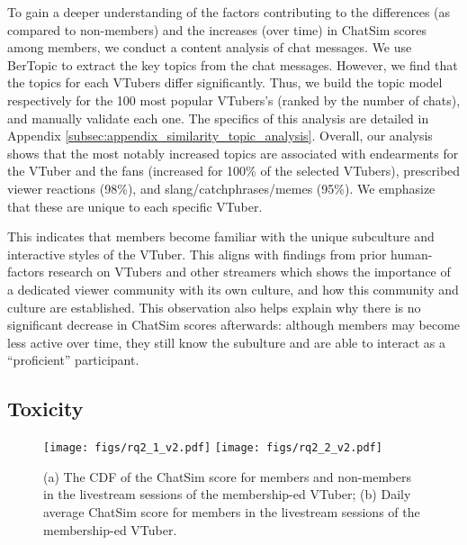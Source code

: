 To gain a deeper understanding of the factors contributing to the differences (as compared to non-members) and the increases (over time) in ChatSim scores among members, we conduct a content analysis of chat messages. 
We use BerTopic \cite{grootendorst2022bertopic} to extract the key topics from the chat messages.
However, we find that the topics for each VTubers differ significantly. 
Thus, we build the topic model respectively for the 100 most popular  VTubers's (ranked by the number of chats), and manually validate each one. 
The specifics of this analysis are detailed in Appendix \ref{subsec:appendix_similarity_topic_analysis}.
Overall, our analysis shows that the most notably increased topics are associated with \one endearments for the VTuber and the fans (increased for 100\% of the selected VTubers), 
\two prescribed viewer reactions (98\%),
and 
\three slang/catchphrases/memes (95\%). 
We emphasize that these are unique to each specific VTuber.  

This indicates that members become familiar with the unique subculture and interactive styles of the VTuber. 
This aligns with findings from prior human-factors research on VTubers \cite{lu2021kawaii} and other streamers \cite{10.1145/3025453.3025854} which shows the importance of a dedicated viewer community with its own  culture, and how this community and culture are established.
This observation also helps explain why there is no significant decrease in ChatSim scores afterwards: although members may become less active over time, they still know the subulture and are able to interact as a ``proficient'' participant. 



\subsection{Toxicity}
\label{subsec:rq2_toxicity}

\begin{figure}[]
    \centering
    \texttt{[image: figs/rq2\_1\_v2.pdf]}
    \hfill
    \texttt{[image: figs/rq2\_2\_v2.pdf]}
    \vspace{-1.5ex}
    \caption{(a) The CDF of the ChatSim score for members and non-members in the livestream sessions of the membership-ed VTuber; (b) Daily average ChatSim score for members in the livestream sessions of the membership-ed VTuber.}
    \vspace{-4ex}
    \label{fig:rq2_1}
\end{figure}

